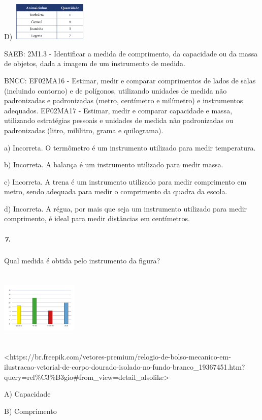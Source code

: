 D)
\includegraphics[width=1.44097in,height=0.72049in]{media/image135.png}

SAEB: 2M1.3 - Identificar a medida de comprimento, da capacidade ou da
massa de objetos, dada a imagem de um instrumento de medida.

BNCC: EF02MA16 - Estimar, medir e comparar comprimentos de lados de
salas (incluindo contorno) e de polígonos, utilizando unidades de medida
não padronizadas e padronizadas (metro, centímetro e milímetro) e
instrumentos adequados. EF02MA17 - Estimar, medir e comparar capacidade
e massa, utilizando estratégias pessoais e unidades de medida não
padronizadas ou padronizadas (litro, mililitro, grama e quilograma).

a) Incorreta. O termômetro é um instrumento utilizado para medir
temperatura.

b) Incorreta. A balança é um instrumento utilizado para medir massa.

c) Incorreta. A trena é um instrumento utilizado para medir comprimento
em metro, sendo adequada para medir o comprimento da quadra da escola.

d) Incorreta. A régua, por mais que seja um instrumento utilizado para
medir comprimento, é ideal para medir distâncias em centímetros.

\subparagraph{7. }\label{section-121}

Qual medida é obtida pelo instrumento da figura?

\includegraphics[width=1.43850in,height=1.43251in]{media/image136.png}

\textless{}https://br.freepik.com/vetores-premium/relogio-de-bolso-mecanico-em-ilustracao-vetorial-de-corpo-dourado-isolado-no-fundo-branco\_19367451.htm?query=rel\%C3\%B3gio\#from\_view=detail\_alsolike\textgreater{}

A) Capacidade

B) Comprimento

